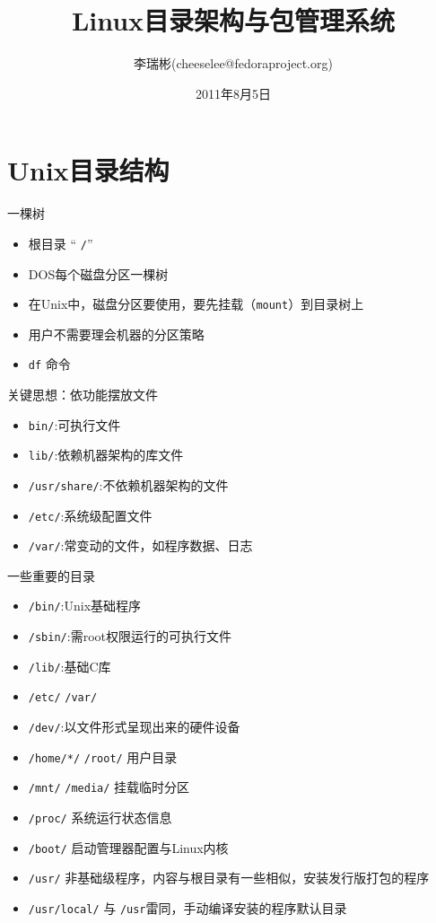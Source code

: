 \documentclass[CJK,xetex]{beamer}
\title{Linux目录架构与包管理系统}
\author[李瑞彬]{李瑞彬(cheeselee@fedoraproject.org)}
\date{2011年8月5日}
\newcommand{\mydir}[1]{{\color{red} \texttt{#1}}}
\begin{document}
\frame{\titlepage}

\section{Unix目录结构}
\begin{frame}{一棵树}
\begin{itemize}[<+->]
  \item 根目录 ``\mydir{/}''
  \item DOS每个磁盘分区一棵树
  \item 在Unix中，磁盘分区要使用，要先挂载（\texttt{mount}）到目录树上
  \item 用户不需要理会机器的分区策略
  \item \texttt{df} 命令
\end{itemize}
\end{frame}

\begin{frame}{关键思想：依功能摆放文件}
  \begin{itemize}[<+->]
  \item \mydir{bin/}:可执行文件
  \item \mydir{lib/}:依赖机器架构的库文件
  \item \mydir{/usr/share/}:不依赖机器架构的文件
  \item \mydir{/etc/}:系统级配置文件
  \item \mydir{/var/}:常变动的文件，如程序数据、日志  
  \end{itemize}
\end{frame}

\begin{frame}{一些重要的目录}
\begin{itemize}[<+->]
  \item \mydir{/bin/}:Unix基础程序
  \item \mydir{/sbin/}:需root权限运行的可执行文件
  \item \mydir{/lib/}:基础C库
  \item \mydir{/etc/} \mydir{/var/}
  \item \mydir{/dev/}:以文件形式呈现出来的硬件设备
  \item \mydir{/home/*/} \mydir{/root/} 用户目录
  \item \mydir{/mnt/} \mydir{/media/} 挂载临时分区
  \item \mydir{/proc/} 系统运行状态信息
  \item \mydir{/boot/} 启动管理器配置与Linux内核
  \item \mydir{/usr/} 非基础级程序，内容与根目录有一些相似，安装发行版打包的程序
  \item \mydir{/usr/local/} 与\mydir{/usr}雷同，手动编译安装的程序默认目录
\end{itemize}
\end{frame}
\end{document}
